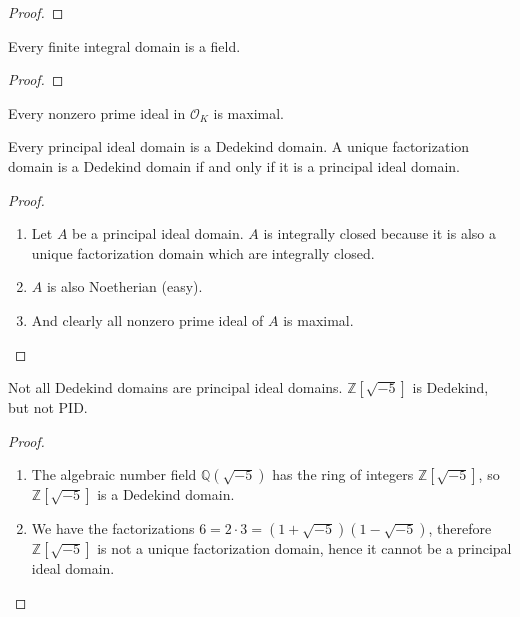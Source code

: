 \begin{proof}
    
\end{proof}

\begin{thmbox}
    \begin{lemma}
        Every finite integral domain is a field.
    \end{lemma}
\end{thmbox}

\begin{proof}
    
\end{proof}

\begin{thmbox}
    \begin{lemma}
        Every nonzero prime ideal in \(\mathcal{O}_K\) is maximal.
    \end{lemma}
\end{thmbox}

\begin{thmbox}
    \begin{theorem}
        Every principal ideal domain is a Dedekind domain. A unique factorization domain is a Dedekind domain if and only if it is a principal ideal domain.
    \end{theorem}
\end{thmbox}

\begin{proof}
    \begin{enumerate}
        \item Let \(A\) be a principal ideal domain. \(A\) is integrally closed because it is also a unique factorization domain which are integrally closed.
        \item \(A\) is also Noetherian (easy).
        \item And clearly all nonzero prime ideal of \(A\) is maximal.
    \end{enumerate}
\end{proof}

\begin{example}
    Not all Dedekind domains are principal ideal domains. \(\mathbb{Z}[\sqrt{-5}]\) is Dedekind, but not PID.
\end{example}
\begin{proof}
    \begin{enumerate}
        \item The algebraic number field \(\mathbb{Q}(\sqrt{-5})\) has the ring of integers \(\mathbb{Z}[\sqrt{-5}]\), so \(\mathbb{Z}[\sqrt{-5}]\) is a Dedekind domain.
        \item We have the factorizations \(6 = 2 \cdot 3 = (1 + \sqrt{-5})(1 - \sqrt{-5})\), therefore \(\mathbb{Z}[\sqrt{-5}]\) is not a unique factorization domain, hence it cannot be a principal ideal domain.
    \end{enumerate}
\end{proof}

